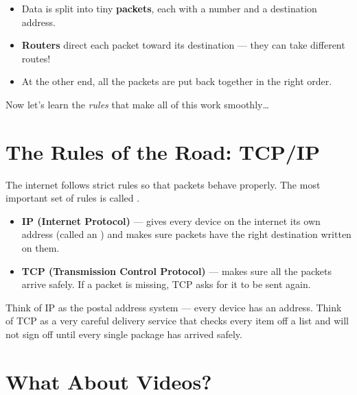 \begin{tcolorbox}[enhanced,colback=SunYellow!12,colframe=SunYellow!70!black,arc=6pt,boxrule=1pt,
  fonttitle=\bfseries\large, title={\faRetweet\quad Remember So Far}]
  \begin{itemize}
    \item Data is split into tiny \textbf{packets}, each with a number and a destination address.
    \item \textbf{Routers} direct each packet toward its destination — they can take different routes!
    \item At the other end, all the packets are put back together in the right order.
  \end{itemize}
  Now let's learn the \emph{rules} that make all of this work smoothly\ldots
\end{tcolorbox}

\section*{The Rules of the Road: TCP/IP}

The internet follows strict rules so that packets behave properly.
The most important set of rules is called .

\begin{itemize}
  \item \textbf{IP (Internet Protocol)} — gives every device on the internet its own address
        (called an ) and makes sure packets have the right destination written on them.
  \item \textbf{TCP (Transmission Control Protocol)} — makes sure all the packets arrive safely.
        If a packet is missing, TCP asks for it to be sent again.
\end{itemize}

\begin{picturethis}
  Think of IP as the postal address system — every device has an address.
  Think of TCP as a very careful delivery service that checks every item off a list
  and will not sign off until every single package has arrived safely.
\end{picturethis}

\sectionrule

\section*{What About Videos?}

